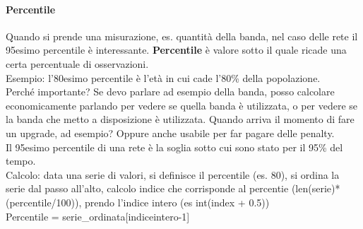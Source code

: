 \documentclass[10pt]{book}
\begin{document}
\paragraph{Percentile} Quando si prende una misurazione, es. quantità della banda, nel caso delle rete il 95esimo percentile è interessante. \textbf{Percentile} è valore sotto il quale ricade una certa percentuale di osservazioni.\\
Esempio: l'80esimo percentile è l'età in cui cade l'80\% della popolazione.\\
Perché importante? Se devo parlare ad esempio della banda, posso calcolare economicamente parlando per vedere se quella banda è utilizzata, o per vedere se la banda che metto a disposizione è utilizzata. Quando arriva il momento di fare un upgrade, ad esempio? Oppure anche usabile per far pagare delle penalty.\\
Il 95esimo percentile di una rete è la soglia sotto cui sono stato per il 95\% del tempo.\\
Calcolo: data una serie di valori, si definisce il percentile (es. 80), si ordina la serie dal passo all'alto, calcolo indice che corrisponde al percentie (len(serie)*(percentile/100)), prendo l'indice intero (es int(index + 0.5))\\
Percentile = serie\_ordinata[indiceintero-1]
\end{document}
